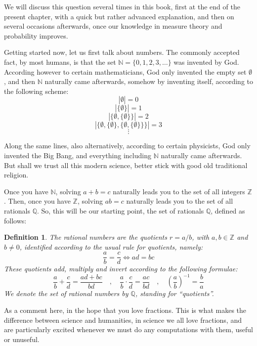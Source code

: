 \documentclass[12pt]{amsbook}
\newtheorem{definition}[theorem]{Definition}
\begin{document}
\bigskip

We will discuss this question several times in this book, first at the end of the present chapter, with a quick but rather advanced explanation, and then on several occasions afterwards, once our knowledge in measure theory and probability improves.

\bigskip

Getting started now, let us first talk about numbers. The commonly accepted fact, by most humans, is that the set $\mathbb N=\{0,1,2,3,\ldots\}$ was invented by God. According however to certain mathematicians, God only invented the empty set $\emptyset$, and then $\mathbb N$ naturally came afterwards, somehow by inventing itself, according to the following scheme:
$$|\emptyset|=0$$
$$|\{\emptyset\}|=1$$
$$|\{\emptyset,\{\emptyset\}\}|=2$$
$$|\{\emptyset,\{\emptyset\},\{\emptyset,\{\emptyset\}\}\}|=3$$
$$\vdots$$

Along the same lines, also alternatively, according to certain physicists, God only invented the Big Bang, and everything including $\mathbb N$ naturally came afterwards. But shall we trust all this modern science, better stick with good old traditional religion.

\bigskip

Once you have $\mathbb N$, solving $a+b=c$ naturally leads you to the set of all integers $\mathbb Z$. Then, once you have $\mathbb Z$, solving $ab=c$ naturally leads you to the set of all rationals $\mathbb Q$. So, this will be our starting point, the set of rationals $\mathbb Q$, defined as follows:


\begin{definition}
The rational numbers are the quotients $r=a/b$, with $a,b\in\mathbb Z$ and $b\neq0$, identified according to the usual rule for quotients, namely:
$$\frac{a}{b}=\frac{c}{d}\iff ad=bc$$
These quotients add, multiply and invert according to the following formulae:
$$\frac{a}{b}+\frac{c}{d}=\frac{ad+bc}{bd}\quad,\quad 
\frac{a}{b}\cdot\frac{c}{d}=\frac{ac}{bd}\quad,\quad
\left(\frac{a}{b}\right)^{-1}=\frac{b}{a}$$
We denote the set of rational numbers by $\mathbb Q$, standing for ``quotients''.
\end{definition}

As a comment here, in the hope that you love fractions. This is what makes the difference between science and humanities, in science we all love fractions, and are particularly excited whenever we must do any computations with them, useful or unuseful.
\end{document}
